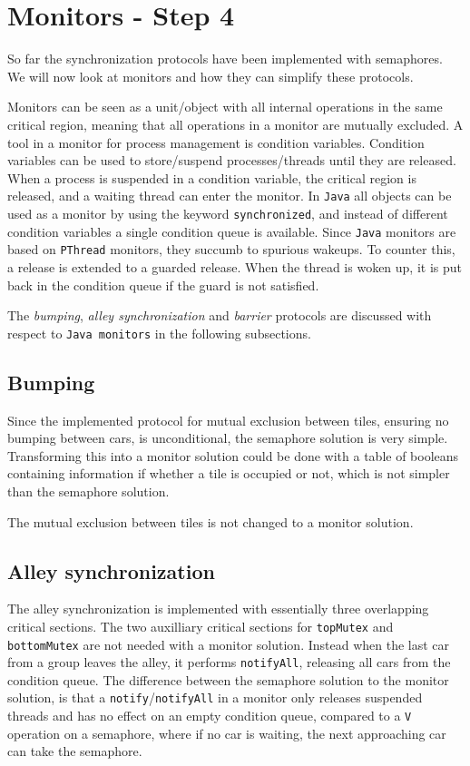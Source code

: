 \section{Monitors - Step 4}
\label{step4}
So far the synchronization protocols have been implemented with semaphores. We will now look at monitors and how they can simplify these protocols. 

Monitors can be seen as a unit/object with all internal operations in the same critical region, meaning that all operations in a monitor are mutually excluded. A tool in a monitor for process management is condition variables. Condition variables can be used to store/suspend processes/threads until they are released. When a process is suspended in a condition variable, the critical region is released, and a waiting thread can enter the monitor. In \texttt{Java} all objects can be used as a monitor by using the keyword \texttt{synchronized}, and instead of different condition variables a single condition queue is available. Since \texttt{Java} monitors are based on \texttt{PThread} monitors, they succumb to spurious wakeups. To counter this, a release is extended to a guarded release. When the thread is woken up, it is put back in the condition queue if the guard is not satisfied. 

The \textit{bumping}, \textit{alley synchronization} and \textit{barrier} protocols are discussed with respect to \texttt{Java monitors} in the following subsections.

\subsection{Bumping}
Since the implemented protocol for mutual exclusion between tiles, ensuring no bumping between cars, is unconditional, the semaphore solution is very simple. Transforming this into a monitor solution could be done with a table of booleans containing information if whether a tile is occupied or not, which is not simpler than the semaphore solution.

The mutual exclusion between tiles is not changed to a monitor solution.

\subsection{Alley synchronization}
The alley synchronization is implemented with essentially three overlapping critical sections. The two auxilliary critical sections for \texttt{topMutex} and \texttt{bottomMutex} are not needed with a monitor solution. Instead when the last car from a group leaves the alley, it performs \texttt{notifyAll}, releasing all cars from the condition queue. The difference between the semaphore solution to the monitor solution, is that a \texttt{notify}/\texttt{notifyAll} in a monitor only releases suspended threads and has no effect on an empty condition queue, compared to a \texttt{V} operation on a semaphore, where if no car is waiting, the next approaching car can take the semaphore. 

